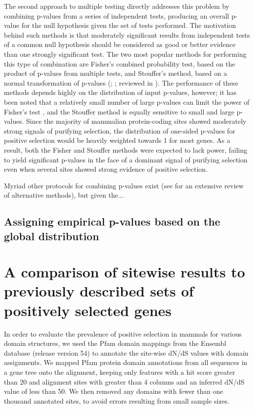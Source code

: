 The second approach to multiple testing directly addresses this
problem by combining p-values from a series of independent tests,
producing an overall p-value for the null hypothesis given the set of
tests performed. The motivation behind such methods is that moderately
significant results from independent tests of a common null hypothesis
should be considered as good or better evidence than one strongly
significant test. The two most popular methods for performing this
type of combination are Fisher's combined probability test, based on
the product of p-values from multiple tests, and Stouffer's method,
based on a normal transformation of p-values (\citealp{Fisher1932};
\citealp{Stouffer1949}; reviewed in \citealp{Whitlock2005}). The
performance of these methods depends highly on the distribution of
input p-values, however; it has been noted that a relatively small
number of large p-values can limit the power of Fisher's test
\citep{Zaykin2002}, and the Stouffer method is equally sensitive to
small and large p-values. Since the majority of mammalian
protein-coding sites showed moderately strong signals of purifying
selection, the distribution of one-sided p-values for positive
selection would be heavily weighted towards 1 for most genes. As a
result, both the Fisher and Stouffer methods were expected to lack
power, failing to yield significant p-values in the face of a dominant
signal of purifying selection even when several sites showed strong
evidence of positive selection.

Myriad other protocols for combining p-values exist (see
\citet{Cousins2007} for an extensive review of alternative methods),
but given the...

\subsection{Assigning empirical p-values based on the global \sw distribution}




\section{A comparison of sitewise results to previously described sets of positively selected genes}

In order to evaluate the prevalence of positive selection in mammals
for various domain structures, we used the Pfam domain mappings from
the Ensembl database (release version 54) to annotate the site-wise
dN/dS values with domain assignments. We mapped Pfam protein domain
annotations from all sequences in a gene tree onto the alignment,
keeping only features with a hit score greater than 20 and alignment
sites with greater than 4 columns and an inferred dN/dS value of less
than 50. We then removed any domains with fewer than one thousand
annotated sites, to avoid errors resulting from small sample sizes.


